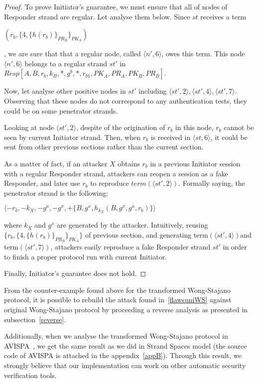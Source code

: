 \begin{proof}
To prove Initiator's guarantee, we must ensure that all of nodes of Responder strand are regular. Let analyse them below.
Since $st$ receives a term \begin{center}$(r_b, \{4,\{h(r_b)\}_{PR_B}\}_{PK_A})$\end{center}, we are sure that that a regular node, called $\langle n',6\rangle $, owes this term. This node $\langle n',6\rangle $ belongs to a regular strand $st'$ in $Resp[A,B,r_b,k_B,*,g^b,*,r_{b1},PK_A,PR_A,PK_B,PR_B]$.

Now, let analyse other positive nodes in $st'$ including $\langle st',2\rangle ,\langle st',4\rangle ,\langle st',7\rangle $. Observing that these nodes do not correspond to any authentication tests, they could be on some penetrator strands. 

Looking at node $\langle st',2\rangle $, despite of the origination of $r_b$ in this node, $r_b$ cannot be seen by current Initiator strand. Then, when $r_b$ is received in $\langle st,6\rangle$, it could be sent from other previous sections rather than the current section. 

As a matter of fact, if an attacker $X$ obtains $r_b$ in a previous Initiator session with a regular Responder strand, attackers can reopen a session as a fake Responder, and later use $r_b$ to reproduce $term(\langle st',2\rangle )$. Formally saying, the penetrator strand is the following:\begin{center} $\langle-r_b,-k_X,-g^a,-g^{x}, +\{B, g^{x}, h_{k_X}(B,g^{x},g^a,r_b)\}\rangle$\end{center} where $k_X$ and $g^x$ are generated by the attacker. Intuitively, reusing $\{r_b, \{4,\{h(r_b)\}_{PR_B}\}_{PK_A}\}$ of previous section, and generating term$(\langle st',4 \rangle)$and term$(\langle st',7 \rangle)$, attackers easily reproduce a fake Responder strand $st'$ in order to finish a proper protocol run with current Initiator. 

Finally, Initiator's guarantee does not hold.  

\end{proof}

From the counter-example found above for the transformed Wong-Stajano protocol, it is possible to rebuild the attack found in~\ref{flawsuniWS} against original Wong-Stajano protocol by proceeding a reverse analysis as presented in subsection~\ref{reverse}. 

Additionally, when we analyse the transformed Wong-Stajano protocol in AVISPA~\cite{Armando:2005:ATA:2153230.2153265}, we get the same result as we did in Strand Spaces model (the source code of AVISPA is attached in the appendix~\ref{appB}). Through this result, we strongly believe that our implementation can work on other automatic security verification tools. 

